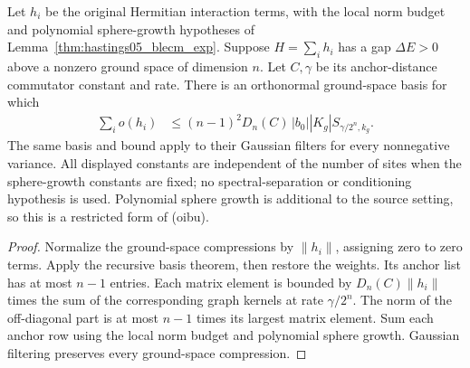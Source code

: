\begin{lemma}
    \label{thm:hastings05_uniform_ground_basis}
    \leanok
    Let $h_i$ be the original Hermitian interaction terms, with the local
    norm budget and polynomial sphere-growth hypotheses of
    Lemma~\ref{thm:hastings05_blecm_exp}. Suppose $H=\sum_i h_i$ has a gap
    $\Delta E>0$ above a nonzero ground space of dimension $n$. Let $C,\gamma$
    be its anchor-distance commutator constant and rate. There is an
    orthonormal ground-space basis for which
    \begin{align}
        \sum_i o(h_i)
         & \le(n-1)^2D_n(C)\,|b_0||K_g|S_{\gamma/2^n,k_g}.
        \label{eq:hastings05_uniform_ground_basis}
    \end{align}
    The same basis and bound apply to their Gaussian filters for every
    nonnegative variance. All displayed constants are independent of the
    number of sites when the sphere-growth constants are fixed; no
    spectral-separation or conditioning hypothesis is used. Polynomial
    sphere growth is additional to the source setting, so this is a
    restricted form of (oibu)\cite{gap:hastings05_geometric_growth_scope}.
\end{lemma}
\begin{proof}\leanok
    Normalize the ground-space compressions by $\|h_i\|$, assigning zero to
    zero terms. Apply the recursive basis theorem, then restore the weights.
    Its anchor list has at most $n-1$ entries. Each matrix element is bounded
    by $D_n(C)\|h_i\|$ times the sum of the corresponding graph kernels at
    rate $\gamma/2^n$. The norm of the off-diagonal part is at most $n-1$
    times its largest matrix element. Sum each anchor row using the local
    norm budget and polynomial sphere growth. Gaussian filtering preserves
    every ground-space compression.
\end{proof}

